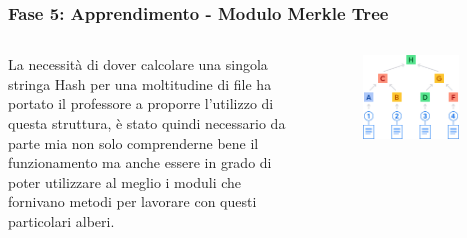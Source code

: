 \documentclass{beamer}
\begin{document}
\begin{frame}
	\frametitle{Fase 5: Apprendimento - Modulo Merkle Tree}
	\begin{columns}
		La necessità di dover calcolare una singola stringa Hash per una moltitudine di file ha portato il professore a proporre l’utilizzo di questa struttura, è stato quindi necessario da parte mia non solo comprenderne bene il funzionamento ma anche essere in grado di poter utilizzare al meglio i moduli che fornivano metodi per lavorare con questi particolari alberi.
		\begin{figure}
			\includegraphics[width=0.88\textwidth]{figures/merkle-tree.jpg}
		\end{figure}
	\end{columns}
\end{frame}
\end{document}
